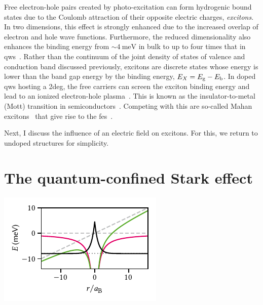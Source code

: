 Free electron-hole pairs created by photo-excitation can form hydrogenic bound states due to the Coulomb attraction of their opposite electric charges, \emph{excitons}.
In two dimensions, this effect is strongly enhanced due to the increased overlap of electron and hole wave functions.
Furthermore, the reduced dimensionality also enhances the binding energy from $\sim\qty{4}{\milli\electronvolt}$ in bulk  to up to four times that in  \glspl{qw}~\cite{Andreani1990,Gilliland1997}.
Rather than the continuum of the joint density of states of valence and conduction band discussed previously, excitons are discrete states whose energy is lower than the band gap energy by the binding energy, $E_X = E_{\mathrm{g}} - E_{\mathrm{b}}$.
In doped \glspl{qw} hosting a \gls{2deg}, the free carriers can screen the exciton binding energy and lead to an ionized electron-hole plasma~\cite{Palmieri2020}.
This is known as the insulator-to-metal (Mott) transition in semiconductors~\cite{Mott1968}.
Competing with this are so-called Mahan excitons~\cite{Mahan1967,Mahan1967a} that give rise to the \gls{fes}~\cite{Schleife2011}.

Next, I discuss the influence of an electric field on excitons.
For this, we return to undoped structures for simplicity.

\section{The quantum-confined Stark effect}\label{sec:exp:theory:qcse}
\begin{marginfigure}
    \centering
    \includegraphics{img/pdf/experiment/in_plane_field}
    \caption[]{
        Effect of an in-plane electric field on an exciton wave function.
        In the hole's reference frame, the electron sees a static attractive Coulomb potential (magenta), resulting in a bound state (dotted gray line, wave function sketched in black).
        Applying an electric field ($F=\qty{100}{\milli\volt\per\micro\meter}$, dashed gray lines) tilts the Coulomb potential (green) and leads to a transparent barrier through which the electron can tunnel out.
    }
    \label{fig:exp:theory:in_plane_field}
\end{marginfigure}


